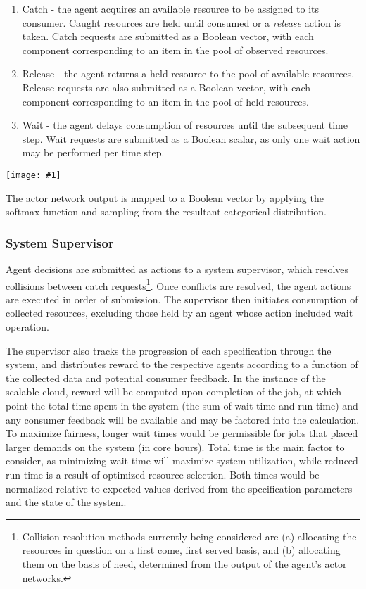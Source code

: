 \documentclass{article}
\theoremstyle{definition}
\theoremstyle{remark}
\newcommand{\addpic}[1]{\texttt{[image: \#1]}}
\begin{document}
			\begin{enumerate}
				\item Catch - the agent acquires an available resource to be assigned to its consumer. Caught resources are held until consumed or a \emph{release} action is taken. Catch requests are submitted as a Boolean vector, with each component corresponding to an item in the pool of observed resources.
				\item Release - the agent returns a held resource to the pool of available resources. Release requests are also submitted as a Boolean vector, with each component corresponding to an item in the pool of held resources.
				\item Wait - the agent delays consumption of resources until the subsequent time step. Wait requests are submitted as a Boolean scalar, as only one wait action may be performed per time step.
			\end{enumerate}
		
			\addpic{figures/agent_action.png}

			The actor network output is mapped to a Boolean vector by applying the softmax function and sampling from the resultant categorical distribution.

		\subsubsection{System Supervisor}

		Agent decisions are submitted as actions to a system supervisor, which resolves collisions between catch requests\footnote{Collision resolution methods currently being considered are (a) allocating the resources in question on a first come, first served basis, and (b) allocating them on the basis of need, determined from the output of the agent's actor networks.}. Once conflicts are resolved, the agent actions are executed in order of submission. The supervisor then initiates consumption of collected resources, excluding those held by an agent whose action included wait operation. 
		
		The supervisor also tracks the progression of each specification through the system, and distributes reward to the respective agents according to a function of the collected data and potential consumer feedback. In the instance of the scalable cloud, reward will be computed upon completion of the job, at which point the total time spent in the system (the sum of wait time and run time) and any consumer feedback will be available and may be factored into the calculation. To maximize fairness, longer wait times would be permissible for jobs that placed larger demands on the system (in core hours). Total time is the main factor to consider, as minimizing wait time will maximize system utilization, while reduced run time is a result of optimized resource selection. Both times would be normalized relative to expected values derived from the specification parameters and the state of the system.
\end{document}
